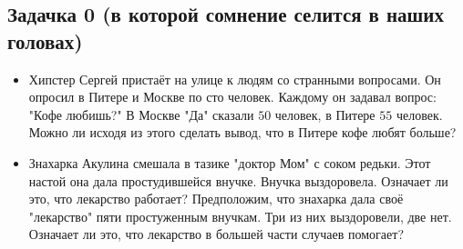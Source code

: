 \documentclass[12pt, a4paper, oneside]{article}
\begin{document}
\subsection*{Задачка 0 (в которой сомнение селится в наших головах)}

\begin{itemize}
	\item  Хипстер Сергей пристаёт на улице к людям со странными вопросами. Он опросил в Питере и Москве по сто человек. Каждому он задавал вопрос: "Кофе любишь?"  В Москве "Да" сказали $50$ человек, в Питере $55$ человек. Можно ли исходя из этого сделать вывод, что в Питере кофе любят больше? 
	
	\item Знахарка Акулина смешала в тазике "доктор Мом" с соком редьки. Этот настой она дала простудившейся внучке. Внучка выздоровела. Означает ли это, что лекарство работает? Предположим, что знахарка дала своё "лекарство" пяти простуженным внучкам. Три из них выздоровели, две нет. Означает ли это, что лекарство в большей части случаев помогает? 
\end{itemize}
\end{document}
